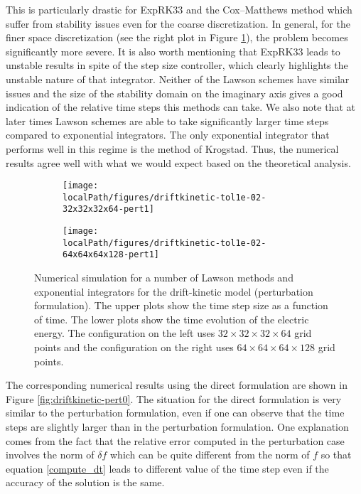 This is particularly drastic for ExpRK33 and the Cox--Matthews method which suffer from stability issues even for the coarse discretization. In general, for the finer space discretization (see the right plot in Figure \ref{fig:driftkinetic-pert1}), the problem becomes significantly more severe. It is also worth mentioning that ExpRK33 leads to unstable results in spite of the step size controller, which clearly highlights the unstable nature of that integrator. 
Neither of the Lawson schemes have similar issues and the size of the stability domain on the imaginary axis gives a good indication of the relative time steps this methods can take. We also note that at later times Lawson schemes are able to take significantly larger time steps compared to exponential integrators. 
The only exponential integrator that performs well in this regime is the method of Krogstad. Thus, the numerical results agree well with what we would expect based on the theoretical analysis. 


\begin{figure}[h]
	\centering
	\begin{subfigure}[b]{0.48\textwidth}
        \centering \texttt{[image: \\localPath/figures/driftkinetic-tol1e-02-32x32x32x64-pert1]}%
	\end{subfigure}
	\begin{subfigure}[b]{0.48\textwidth}
        \centering \texttt{[image: \\localPath/figures/driftkinetic-tol1e-02-64x64x64x128-pert1]}%
	\end{subfigure}
    \caption{Numerical simulation for a number of Lawson methods and exponential integrators for the drift-kinetic model (perturbation formulation). The upper plots show the time step size as a function of time. The lower plots show the time evolution of the electric energy. The configuration on the left uses $32 \times 32 \times 32 \times 64$ grid points and the configuration on the right uses $64 \times 64 \times 64 \times 128$ grid points.}\label{fig:driftkinetic-pert1}
\end{figure}

The corresponding numerical results using the direct formulation are shown in Figure \ref{fig:driftkinetic-pert0}. The situation for the direct formulation is very similar to the perturbation formulation, even if one 
can observe that the time steps are slightly larger than in the perturbation formulation. 
One explanation comes from the fact that the relative error computed in the perturbation 
case involves the norm of $\delta f$ which can be quite different from the norm 
of $f$ so that equation \eqref{compute_dt} leads to different value of the time step 
even if the accuracy of the solution is the same.


